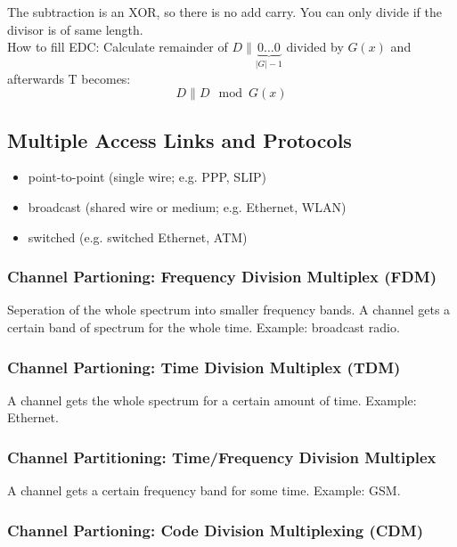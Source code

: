 \documentclass[10pt, a4paper, twocolumn]{scrartcl}
\begin{document}
The subtraction is an XOR, so there is no add carry. You can only divide if the divisor is of same length.\\

How to fill EDC: Calculate remainder of $D \parallel \underbrace{0\ldots 0}_{|G| -1}$ divided by $G(x)$ and afterwards T becomes:
\begin{displaymath}
	D \parallel D \mod G(x)
\end{displaymath}

\subsection{Multiple Access Links and Protocols}

\begin{itemize}
	\item point-to-point (single wire; e.g. PPP, SLIP)
	\item broadcast (shared wire or medium; e.g. Ethernet, WLAN)
	\item switched (e.g. switched Ethernet, ATM)
\end{itemize}

\subsubsection{Channel Partioning: Frequency Division Multiplex (FDM)}

Seperation of the whole spectrum into smaller frequency bands. A channel gets a certain band of spectrum for the whole time. Example: broadcast radio.

\subsubsection{Channel Partioning: Time Division Multiplex (TDM)}

A channel gets the whole spectrum for a certain amount of time. Example: Ethernet.

\subsubsection{Channel Partitioning: Time/Frequency Division Multiplex}

A channel gets a certain frequency band for some time. Example: GSM.

\subsubsection{Channel Partioning: Code Division Multiplexing (CDM)}
\end{document}
